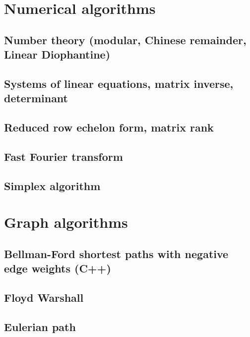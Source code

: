 \section{Numerical algorithms}
\subsection{Number theory (modular, Chinese remainder, Linear Diophantine)}
\raggedbottom
\hrulefill
\subsection{Systems of linear equations, matrix inverse, determinant}
\raggedbottom
\hrulefill
\subsection{Reduced row echelon form, matrix rank}
\raggedbottom
\hrulefill
\subsection{Fast Fourier transform}
\raggedbottom
\hrulefill
\subsection{Simplex algorithm}
\raggedbottom
\hrulefill

\section{Graph algorithms}
\subsection{Bellman-Ford shortest paths with negative edge weights (C++)}
\raggedbottom
\hrulefill
\subsection{Floyd Warshall}
\raggedbottom
\hrulefill
\subsection{Eulerian path}
\raggedbottom
\hrulefill
